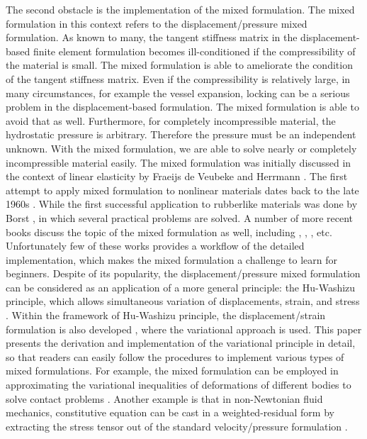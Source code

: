 The second obstacle is the implementation of the mixed formulation. The mixed formulation in this context  refers to the displacement/pressure mixed formulation. As known to many, the tangent stiffness matrix in the displacement-based finite element formulation becomes ill-conditioned if the compressibility of the material is small. The mixed formulation is able to ameliorate the condition of the tangent stiffness matrix. Even if the compressibility is relatively large, in many circumstances, for example the vessel expansion, locking can be a serious problem in the displacement-based formulation. The mixed formulation is able to avoid that as well. Furthermore, for completely incompressible material, the hydrostatic pressure is arbitrary. Therefore the pressure must be an independent unknown. With the mixed formulation, we are able to solve nearly or completely incompressible material easily. 
The mixed formulation was initially discussed in the context of linear elasticity by Fraeijs de Veubeke \cite{Veubeke} and Herrmann \cite{Herrmann}. The first attempt to apply mixed formulation to nonlinear materials dates back to the late 1960s \cite{Oden}. While the first successful application to rubberlike materials was done by Borst \cite{Borst}, in which several practical problems are solved. A number of more recent books discuss the topic of the mixed formulation as well, including \cite{Bathe}, \cite{Holzapfel}, \cite{Zienkiewicz}, etc. Unfortunately few of these works provides a workflow of the detailed implementation, which makes the mixed formulation a challenge to learn for beginners. Despite of its popularity, the displacement/pressure mixed formulation can be considered as an application of a more general principle: the Hu-Washizu principle, which allows simultaneous variation of displacements, strain, and stress \cite{Hu}. Within the framework of Hu-Washizu principle, the displacement/strain formulation is also developed \cite{Cervera, Rifai}, where the variational approach is used. This paper presents the derivation and implementation of the variational principle in detail, so that readers can easily follow the procedures to implement various types of mixed formulations. For example, the mixed formulation can be employed in approximating the variational inequalities of deformations of different bodies to solve contact problems \cite{Taylor}. Another example is that in non-Newtonian fluid mechanics, constitutive equation can be cast in a weighted-residual form by extracting the stress tensor out of the standard velocity/pressure formulation \cite{Baaijens}. 

